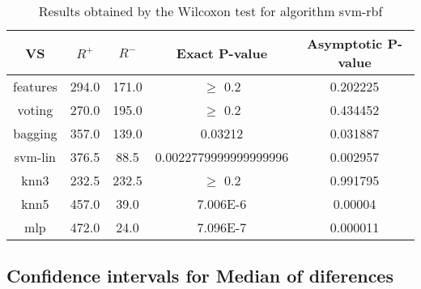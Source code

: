 \documentclass[a4paper,10pt]{article}
\begin{document}
\begin{table}[!htp]
\centering\small
\begin{tabular}{
|c|c|c|c|c|}
\hline
 VS & $R^{+}$ & $R^{-}$ & Exact P-value & Asymptotic P-value \\ \hline 
features & 294.0 & 171.0 & $\geq$ 0.2 & 0.202225\\ \hline 
voting & 270.0 & 195.0 & $\geq$ 0.2 & 0.434452\\ \hline 
bagging & 357.0 & 139.0 & 0.03212 & 0.031887\\ \hline 
svm-lin & 376.5 & 88.5 & 0.0022779999999999996 & 0.002957\\ \hline 
knn3 & 232.5 & 232.5 & $\geq$ 0.2 & 0.991795\\ \hline 
knn5 & 457.0 & 39.0 & 7.006E-6 & 0.00004\\ \hline 
mlp & 472.0 & 24.0 & 7.096E-7 & 0.000011\\ \hline 

\end{tabular}
\caption{Results obtained by the Wilcoxon test for algorithm svm-rbf}
\end{table}

\subsection{Confidence intervals for Median of diferences}
\end{document}
